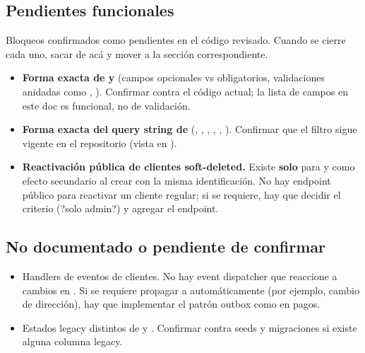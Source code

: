 \subsection{Pendientes funcionales}

Bloqueos confirmados como pendientes en el código revisado. Cuando se cierre cada uno, sacar de acá y mover a la sección correspondiente.

\begin{itemize}
\item \textbf{Forma exacta de \texttt{} y \texttt{}} (campos opcionales vs obligatorios, validaciones anidadas como \texttt{}, \texttt{}). Confirmar contra el código actual; la lista de campos en este doc es funcional, no de validación.
\item \textbf{Forma exacta del query string de \texttt{}} (\texttt{}, \texttt{}, \texttt{}, \texttt{}, \texttt{}, \texttt{}). Confirmar que el filtro \texttt{} sigue vigente en el repositorio (vista en \texttt{}).
\item \textbf{Reactivación pública de clientes soft-deleted.} Existe \textbf{solo} para \texttt{} y como efecto secundario al crear con la misma identificación. No hay endpoint público para reactivar un cliente regular; si se requiere, hay que decidir el criterio (?solo admin?) y agregar el endpoint.
\end{itemize}

\subsection{No documentado o pendiente de confirmar}

\begin{itemize}
\item Handlers de eventos de clientes. No hay event dispatcher que reaccione a cambios en \texttt{}. Si se requiere propagar a \texttt{} automáticamente (por ejemplo, cambio de dirección), hay que implementar el patrón outbox como en pagos.
\item Estados legacy distintos de \texttt{} y \texttt{}. Confirmar contra seeds y migraciones si existe alguna columna legacy.
\end{itemize}
